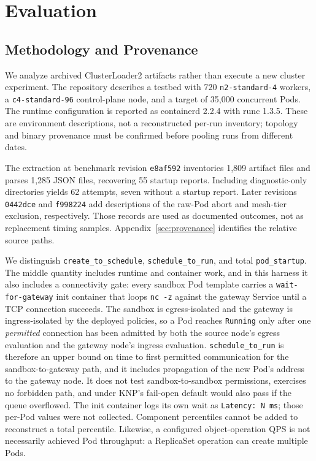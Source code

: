 \documentclass[letterpaper,twocolumn,10pt]{article}
\newcommand{\sys}{\textsc{KNP}}
\begin{document}
\section{Evaluation}
\label{sec:evaluation}
\subsection{Methodology and Provenance}
We analyze archived ClusterLoader2 artifacts rather than execute a new
cluster experiment. The repository describes a testbed with 720
\texttt{n2-standard-4} workers, a \texttt{c4-standard-96} control-plane
node, and a target of 35,000 concurrent Pods. The runtime configuration
is reported as containerd 2.2.4 with runc 1.3.5. These are environment
descriptions, not a reconstructed per-run inventory; topology and binary
provenance must be confirmed before pooling runs from different dates.

The extraction at benchmark revision \texttt{e8af592} inventories 1,809
artifact files and parses 1,285 JSON files, recovering 55 startup reports.
Including diagnostic-only directories yields 62 attempts, seven without
a startup report. Later revisions \texttt{0442dce} and \texttt{f998224}
add descriptions of the raw-Pod abort and mesh-tier exclusion, respectively.
Those records are used as documented outcomes, not as replacement timing
samples. Appendix~\ref{sec:provenance} identifies the relative source paths.

We distinguish \texttt{create\_to\_schedule},
\texttt{schedule\_to\_run}, and total \texttt{pod\_startup}.
The middle quantity includes runtime and container work, and in this
harness it also includes a connectivity gate: every sandbox Pod template
carries a \texttt{wait-for-gateway} init container that loops
\texttt{nc -z} against the gateway Service until a TCP connection
succeeds. The sandbox is egress-isolated and the gateway is
ingress-isolated by the deployed policies, so a Pod reaches
\texttt{Running} only after one \emph{permitted} connection has been
admitted by both the source node's egress evaluation and the gateway
node's ingress evaluation. \texttt{schedule\_to\_run} is therefore an
upper bound on time to first permitted communication for the
sandbox-to-gateway path, and it includes propagation of the new Pod's
address to the gateway node. It does not test sandbox-to-sandbox
permissions, exercises no forbidden path, and under \sys{}'s fail-open
default would also pass if the queue overflowed. The init container logs
its own wait as \texttt{Latency: N ms}; those per-Pod values were not
collected. Component percentiles cannot be added to reconstruct a total
percentile. Likewise, a configured object-operation QPS is not necessarily
achieved Pod throughput: a ReplicaSet operation can create multiple Pods.
\end{document}
